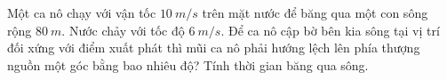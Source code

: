 \begin{vidu} %
Một ca nô chạy với vận tốc $10\ m/s$ trên mặt nước để băng qua một con sông rộng $80\ m$. Nước chảy với tốc độ $6\ m/s$. Để ca nô cập bờ bên kia sông tại vị trí đối xứng với điểm xuất phát thì mũi ca nô phải hướng lệch lên phía thượng nguồn một góc bằng bao nhiêu độ? Tính thời gian băng qua sông.
\end{vidu}

